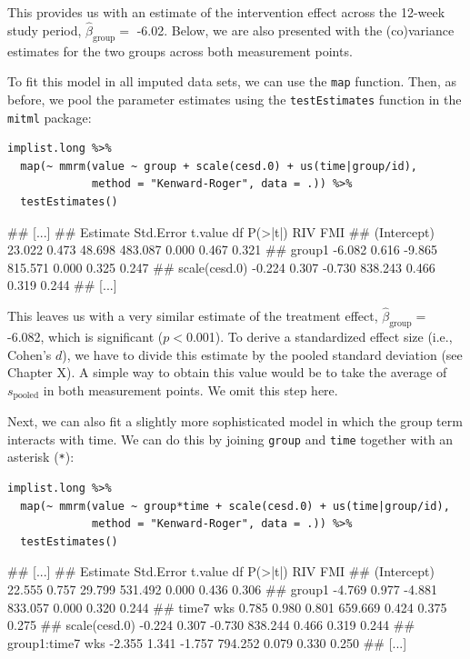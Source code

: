This provides us with an estimate of the intervention effect across the 12-week study period, $\hat\beta_{\text{group}}=$ -6.02. Below, we are also presented with the (co)variance estimates for the two groups across both measurement points. 

To fit this model in all imputed data sets, we can use the \texttt{map} function. Then, as before, we pool the parameter estimates using the \texttt{testEstimates} function in the \texttt{mitml} package:

\begin{lstlisting}
implist.long %>% 
  map(~ mmrm(value ~ group + scale(cesd.0) + us(time|group/id), 
             method = "Kenward-Roger", data = .)) %>% 
  testEstimates()
\end{lstlisting}

\begin{example}
## [...]
##               Estimate Std.Error t.value      df P(>|t|)   RIV   FMI 
## (Intercept)     23.022     0.473  48.698 483.087   0.000 0.467 0.321 
## group1          -6.082     0.616  -9.865 815.571   0.000 0.325 0.247 
## scale(cesd.0)   -0.224     0.307  -0.730 838.243   0.466 0.319 0.244
## [...]
\end{example}

This leaves us with a very similar estimate of the treatment effect, $\hat\beta_{\text{group}}=$-6.082, which is significant ($p<$0.001). To derive a standardized effect size (i.e., Cohen's $d$), we have to divide this estimate by the pooled standard deviation (see Chapter X). A simple way to obtain this value would be to take the average of $s_{\text{pooled}}$ in both measurement points. We omit this step here. 

Next, we can also fit a slightly more sophisticated model in which the group term interacts with time. We can do this by joining \texttt{group} and \texttt{time} together with an asterisk (\texttt{*}):

\begin{lstlisting}
implist.long %>% 
  map(~ mmrm(value ~ group*time + scale(cesd.0) + us(time|group/id), 
             method = "Kenward-Roger", data = .)) %>% 
  testEstimates()
\end{lstlisting}

\begin{example}
## [...]
##                  Estimate Std.Error t.value      df P(>|t|)   RIV   FMI 
## (Intercept)        22.555     0.757  29.799 531.492   0.000 0.436 0.306 
## group1             -4.769     0.977  -4.881 833.057   0.000 0.320 0.244 
## time7 wks           0.785     0.980   0.801 659.669   0.424 0.375 0.275 
## scale(cesd.0)      -0.224     0.307  -0.730 838.244   0.466 0.319 0.244 
## group1:time7 wks   -2.355     1.341  -1.757 794.252   0.079 0.330 0.250 
## [...]
\end{example}

